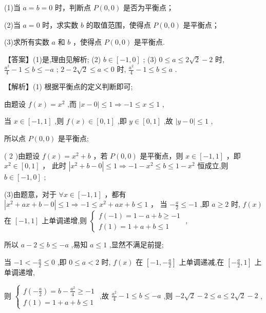 \documentclass[10pt]{article}
\begin{document}
(1)当 \(a = b = 0\) 时，判断点 \(P\left( {0,0}\right)\) 是否为平衡点；

(2)当 \(a = 0\) 时，求实数 \(b\) 的取值范围，使得点 \(P\left( {0,0}\right)\) 是平衡点；

(3)求所有实数 \(a\) 和 \(b\) ，使得点 \(P\left( {0,0}\right)\) 是平衡点.

【答案】(1)是,理由见解析; (2) \(b \in  \left\lbrack  {-1,0}\right\rbrack\) ; (3) \(0 \leq  a \leq  2\sqrt{2} - 2\) 时, \(\frac{{a}^{2}}{4} - 1 \leq  b \leq   - a\) ; \(2 - 2\sqrt{2} \leq  a < 0\) 时, \(\frac{{a}^{2}}{4} - 1 \leq  b \leq  a\) .

【解析】(1) 根据平衡点的定义判断即可;

由题设 \(f\left( x\right)  = {x}^{2}\) ,而 \(\left| {x - 0}\right|  \leq  1 \Rightarrow   - 1 \leq  x \leq  1\) ,

当 \(x \in  \left\lbrack  {-1,1}\right\rbrack\) ,则 \(f\left( x\right)  \in  \left\lbrack  {0,1}\right\rbrack\) ,即 \(y \in  \left\lbrack  {0,1}\right\rbrack\) ,故 \(\left| {y - 0}\right|  \leq  1\) ,

所以点 \(P\left( {0,0}\right)\) 是平衡点;

( 2 )由题设 \(f\left( x\right)  = {x}^{2} + b\) ，若 \(P\left( {0,0}\right)\) 是平衡点，则 \(x \in  \left\lbrack  {-1,1}\right\rbrack\) ，即 \({x}^{2} \in  \left\lbrack  {0,1}\right\rbrack\) ， 此时 \(\left| {{x}^{2} + b - 0}\right|  \leq  1 \Rightarrow   - 1 - {x}^{2} \leq  b \leq  1 - {x}^{2}\) 恒成立,则 \(b \in  \left\lbrack  {-1,0}\right\rbrack\) ;

(3)由题意，对于 \(\forall x \in  \left\lbrack  {-1,1}\right\rbrack\) ，都有 \(\left| {{x}^{2} + {ax} + b - 0}\right|  \leq  1 \Rightarrow   - 1 \leq  {x}^{2} + {ax} + b \leq  1\) ， 当 \(- \frac{a}{2} \leq   - 1\) ,即 \(a \geq  2\) 时, \(f\left( x\right)\) 在 \(\left\lbrack  {-1,1}\right\rbrack\) 上单调递增,则 \(\left\{  \begin{array}{l} f\left( {-1}\right)  = 1 - a + b \geq   - 1 \\  f\left( 1\right)  = 1 + a + b \leq  1 \end{array}\right.\) ,

所以 \(a - 2 \leq  b \leq   - a\) ,易知 \(a \leq  1\) ,显然不满足前提;

当 \(- 1 <  - \frac{a}{2} \leq  0\) ,即 \(0 \leq  a < 2\) 时, \(f\left( x\right)\) 在 \(\left\lbrack  {-1, - \frac{a}{2}}\right\rbrack\) 上单调递减,在 \(\left\lbrack  {-\frac{a}{2},1}\right\rbrack\) 上单调递增,

则 \(\left\{  \begin{array}{l} f\left( {-\frac{a}{2}}\right)  = b - \frac{{a}^{2}}{4} \geq   - 1 \\  f\left( 1\right)  = 1 + a + b \leq  1 \end{array}\right.\) ,故 \(\frac{{a}^{2}}{4} - 1 \leq  b \leq   - a\) ,则 \(- 2\sqrt{2} - 2 \leq  a \leq  2\sqrt{2} - 2\) ,
\end{document}
